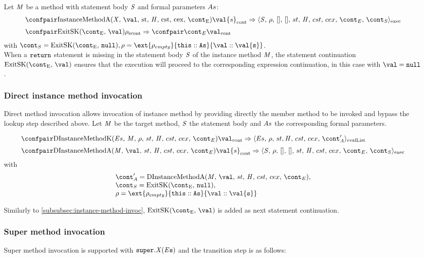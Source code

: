 \documentclass{article}
\newcommand{\cesktrans}[2]{\ensuremath{{#1} \Rightarrow {#2}}}
\begin{document}
\noindent
Let $\mathit{M}$ be a method with statement body $\mathit{S}$ and formal parameters $As$:
\[
  \begin{array}{lcl}
	\cesktrans{
		\contconf{\InstanceMethodInvocationArgsApp}{\val{s}}}{
		\execconf{\stmt}{\env}{[]}{[]}{\handler}{\cstrace}{\cex}{\econt}{\scont}}
	\\[2mm]
	\cesktrans{
		\scontconf{\ExitSK{\val}}{\env}}{
		\contconf{\econt}{\val}}
  \end{array}
\]
with $\scont = \ExitSK{\tt{null}}, \env = \ext{\env_{empty}}{\this :: \formals}{\val :: \val{s}}$.\\[2mm]

\noindent
When a $\tt{return}$ statement is missing in the statement body $\mathit{S}$ of the instance method $\mathit{M}$, the statement continuation $\ExitSK{\val}$ ensures that the execution will proceed to the corresponding expression continuation, in this case with $\val = \tt{null}$.

\subsubsection{Direct instance method invocation}
\label{subsubsec:direct-instance-method-invoc}
Direct method invocation allows invocation of instance method by providing directly the member method to be invoked and bypass the lookup step described above.
Let $\mathit{M}$ be the target method, $\mathit{S}$ the statement body and $As$ the corresponding formal parameters.

\[
  \begin{array}{lcl}
	\cesktrans{
		\contconf{\DInstanceMethodK}{\val}}{
		\evallistconf{\expressionsmeta}{\env}{\strace}{\cstrace}{\cex}{\acont'}}
	\\[2mm]

	\cesktrans{
		\contconf{\DInstanceMethodA}{\val{s}}}{
		\execconf{\stmt}{\env}{[]}{[]}{\handler}{\cstrace}{\cex}{\econt}{\scont}}
  \end{array}
\]
with
\[
\begin{array}{l}
	\acont' = \DInstanceMethodA,\\
	\scont = \ExitSK{\tt{null}},\\
	\env = \ext{\env_{empty}}{\this :: \formals}{\val :: \val{s}}
\end{array}
\]

\noindent
Similarly to \ref{subsubsec:instance-method-invoc}, $\ExitSK{\val}$ is added as next statement continuation.

\subsubsection{Super method invocation}
\label{subsubsec:super-method-invocation}
Super method invocation is supported with $\tt{super}.\mathit{X}(\mathit{E}{s})$ and the transition step is as follows:
\end{document}
